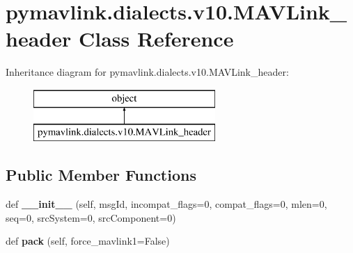 \hypertarget{classpymavlink_1_1dialects_1_1v10_1_1MAVLink__header}{}\section{pymavlink.\+dialects.\+v10.\+M\+A\+V\+Link\+\_\+header Class Reference}
\label{classpymavlink_1_1dialects_1_1v10_1_1MAVLink__header}
Inheritance diagram for pymavlink.\+dialects.\+v10.\+M\+A\+V\+Link\+\_\+header\+:\begin{figure}[H]
\begin{center}
\leavevmode
\includegraphics[height=2.000000cm]{classpymavlink_1_1dialects_1_1v10_1_1MAVLink__header}
\end{center}
\end{figure}
\subsection*{Public Member Functions}
\begin{DoxyCompactItemize}
\item 
\mbox{\label{classpymavlink_1_1dialects_1_1v10_1_1MAVLink__header_a7788fc4e123babe285c8955e56a8b836}} 
def {\bfseries \+\_\+\+\_\+init\+\_\+\+\_\+} (self, msg\+Id, incompat\+\_\+flags=0, compat\+\_\+flags=0, mlen=0, seq=0, src\+System=0, src\+Component=0)
\item 
\mbox{\label{classpymavlink_1_1dialects_1_1v10_1_1MAVLink__header_a8eff24cab9b13191806f31a139206234}} 
def {\bfseries pack} (self, force\+\_\+mavlink1=False)
\end{DoxyCompactItemize}
